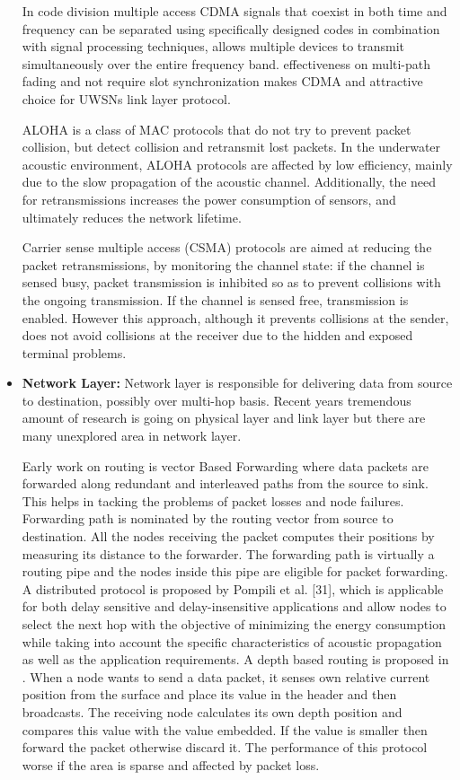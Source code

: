 \documentclass[12pt]{article}
\begin{document}
\begin{itemize}
In code division multiple access CDMA signals that coexist in both time and frequency
can be separated using specifically designed codes in combination with signal
processing techniques, allows multiple devices to transmit
simultaneously over the entire frequency band. effectiveness on multi-path fading and not require slot synchronization makes CDMA and attractive choice for UWSNs link layer protocol.

ALOHA is a class of MAC protocols that do not try to prevent packet
collision, but detect collision and retransmit lost packets. In the
underwater acoustic environment, ALOHA protocols are affected by low
efficiency, mainly due to the slow propagation of the acoustic channel.
Additionally, the need for retransmissions increases the power
consumption of sensors, and ultimately reduces the network lifetime.

Carrier sense multiple access (CSMA) protocols are aimed at reducing
the packet retransmissions, by monitoring the channel state: if the
channel is sensed busy, packet transmission is inhibited so as to prevent
collisions with the ongoing transmission. If the channel is sensed free,
transmission is enabled. However this approach, although it prevents
collisions at the sender, does not avoid collisions at the receiver due to
the hidden and exposed terminal problems.

\item \textbf{Network Layer: }
Network layer is responsible for delivering data from source to destination, possibly over multi-hop basis. Recent years tremendous amount of research is going on physical layer and link layer but there are many unexplored area in network layer.

Early work on routing is vector Based Forwarding \cite{xie2006vbf} where data packets are forwarded along redundant and interleaved paths from the source to sink. This helps in tacking the problems of packet losses and node failures. Forwarding path is nominated by the routing vector from source to destination. All the nodes receiving the packet computes their positions by measuring its distance to the forwarder. The forwarding path is virtually a routing pipe and the nodes inside this pipe are eligible for packet forwarding. A distributed protocol is proposed by Pompili et al. [31], which is applicable for both delay sensitive and delay-insensitive applications and allow nodes to select the next hop with the objective of minimizing the energy consumption while taking into account the specific characteristics of acoustic propagation as well as the application requirements. A depth based routing is proposed in \cite{yan2008dbr}. When a node wants to send a data packet, it senses own relative current position from the surface and place its value in the header and then broadcasts. The receiving node calculates its own depth position and compares this value with the value embedded. If the value is smaller then forward the packet otherwise discard it. The performance of this protocol worse if the area is sparse and affected by packet loss.


\end{itemize}
\end{document}
